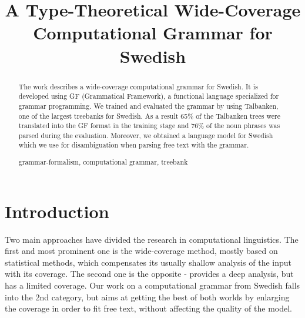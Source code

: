 \documentclass[runningheads,a4paper]{llncs}
\newcommand{\keywords}[1]{\par\addvspace\baselineskip
\noindent\keywordname\enspace\ignorespaces#1}
\begin{document}
\mainmatter  %

\title{A Type-Theoretical Wide-Coverage Computational Grammar for Swedish}

\author{}
\institute{}


\maketitle


\begin{abstract}
The work describes a wide-coverage computational grammar for Swedish. 
It is developed using GF (Grammatical Framework), a %
functional language specialized for grammar programming. We trained
and evaluated the grammar by using Talbanken, one of the largest treebanks for 
Swedish. As a result 65$\%$ of the Talbanken trees were translated
into the GF format in the training stage and 76\% of the noun phrases
was parsed during the evaluation. Moreover, we obtained a language
model for Swedish which we use for disambiguation when parsing free text
with the grammar. 
\keywords{grammar-formalism, computational grammar, treebank}
\end{abstract}


\section{Introduction}



Two main approaches have divided the research in computational linguistics.
The first and most prominent  one is the
wide-coverage method, mostly based on
statistical methods, which compensates its usually shallow analysis of the
input with its coverage. The second one is the opposite - provides
a deep analysis, but has a limited coverage. Our work on a
computational grammar from Swedish falls into the 2nd category, but
aims at getting the best of both worlds by enlarging the coverage in
order to fit free text, without affecting the quality of the model.

%
%
\end{document}
